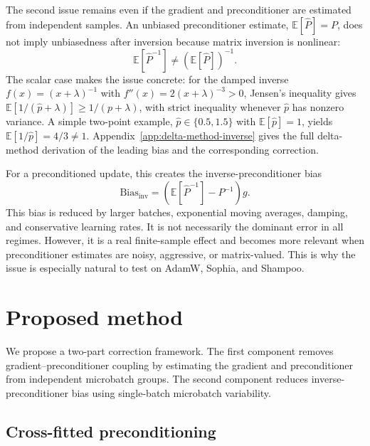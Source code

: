 \documentclass{article}
\newcommand{\E}{\mathbb{E}}
\begin{document}
The second issue remains even if the gradient and preconditioner are estimated from independent samples. An unbiased preconditioner estimate, $\E[\hat P] = P$, does not imply unbiasedness after inversion because matrix inversion is nonlinear:
\begin{equation}
    \E[\hat P^{-1}]
    \neq
    \left(\E[\hat P]\right)^{-1}.
    \label{eq:inverse-bias}
\end{equation}
The scalar case makes the issue concrete: for the damped inverse $f(x)=(x+\lambda)^{-1}$ with $f''(x)=2(x+\lambda)^{-3}>0$, Jensen's inequality gives $\E[1/(\hat p+\lambda)]\geq 1/(p+\lambda)$, with strict inequality whenever $\hat p$ has nonzero variance. A simple two-point example, $\hat p\in\{0.5,1.5\}$ with $\E[\hat p]=1$, yields $\E[1/\hat p]=4/3\neq 1$. Appendix~\ref{app:delta-method-inverse} gives the full delta-method derivation of the leading bias and the corresponding correction.

For a preconditioned update, this creates the inverse-preconditioner bias
\begin{equation}
    \mathrm{Bias}_{\mathrm{inv}}
    =
    \left(\E[\hat P^{-1}] - P^{-1}\right)g.
    \label{eq:inverse-preconditioner-bias}
\end{equation}
This bias is reduced by larger batches, exponential moving averages, damping, and conservative learning rates. It is not necessarily the dominant error in all regimes. However, it is a real finite-sample effect and becomes more relevant when preconditioner estimates are noisy, aggressive, or matrix-valued. This is why the issue is especially natural to test on AdamW, Sophia, and Shampoo.

\section{Proposed method}
\label{sec:method}

We propose a two-part correction framework. The first component removes gradient--preconditioner coupling by estimating the gradient and preconditioner from independent microbatch groups. The second component reduces inverse-preconditioner bias using single-batch microbatch variability.

\subsection{Cross-fitted preconditioning}
\end{document}
